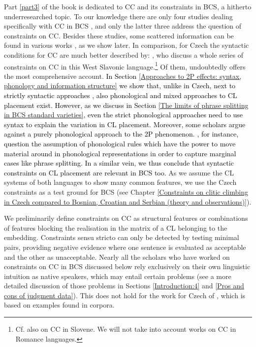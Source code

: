 Part \ref{part3} of the book is dedicated to CC and its constraints in BCS, a hitherto underresearched topic. To our knowledge there are only four studies dealing specifically with CC in BCS \citep{Caink04, Stjepanovic04,  Aljovic04, Aljovic05}, and only the latter three address the question of constraints on CC. Besides these studies, some scattered information can be found in various works \citep[e.g.][]{CamdzicHudson2002, Todorovic12}, as we show later. In comparison, for Czech the syntactic conditions for CC are much better described by: \citet{Rezac99, Rezac05, Junghanns02, Dotlacil04, Rosen01, Rosen14, Hana07, Lenertova04}, who discuss a whole series of constraints on CC in this West Slavonic language.\footnote{Cf. also \citet[247]{FranksKing00} on CC in Slovene. We will not take into account works on CC in Romance languages.} Of them, \citet{Junghanns02} undoubtedly offers the most comprehensive account. 
\textcolor{black}{In Section \ref{Approaches to 2P effects: syntax, phonology and information structure} we show that, unlike in Czech, next to strictly syntactic approaches \citep[e.g.][]{Progovac96, Franks97}, also phonological \citep[e.g.][]{RadanovicKocic88, RadanovicKocic96} and mixed approaches \citep[e.g.][]{Schutze94, Boskovic00, Boskovic01} to CL placement exist. However, as we discuss in Section \ref{The limits of phrase splitting in BCS standard varieties}, even the strict phonological approaches need to use syntax to explain the variation in CL placement. Moreover, some scholars argue against a purely phonological approach to the 2P phenomenon. \citet[441]{CavarWilder94}, for instance, question the assumption of phonological rules which have the power to move material around in phonological representations in order to capture marginal cases like phrase splitting. In a similar vein, we thus conclude that syntactic constraints on CL placement are relevant in BCS too.} As we assume the CL systems of both languages to show many common features, we use the Czech constraints as a test ground for BCS (see Chapter \ref{Constraints on clitic climbing in Czech compared to Bosnian, Croatian and Serbian (theory and observations)}).

We preliminarily define constraints on CC as structural features or combinations of features blocking the realisation in the matrix of a CL belonging to the embedding. Constraints sensu stricto can only be detected by testing minimal pairs, providing negative evidence where one sentence is evaluated as acceptable and the other as unacceptable. Nearly all the scholars who have worked on constraints on CC in BCS discussed below rely exclusively on their own linguistic intuition as native speakers, which may entail certain problems (see a more detailed discussion of those problems in Sections \ref{Introduction:4} and \ref{Pros and cons of judgment data}). This does not hold for the work for Czech of \citet{Junghanns02}, which is based on examples found in corpora.  

